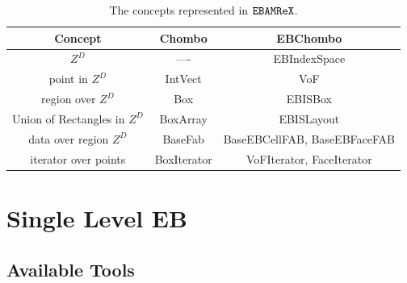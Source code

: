 \begin{table}
\begin{center}
\begin{tabular}{|c||c|c|} 
\hline
Concept & Chombo & EBChombo 
\\ \hline\hline
$Z^D$             &  ----   & EBIndexSpace
\\
point in $Z^D$    & IntVect & VoF 
\\
region over $Z^D$ & Box     & EBISBox
\\
Union of Rectangles in $Z^D$ & BoxArray     & EBISLayout
\\
data over region $Z^D$ & BaseFab & BaseEBCellFAB, BaseEBFaceFAB
\\ 
iterator over points & BoxIterator & VoFIterator, FaceIterator
\\ 
\hline                                                 
\end{tabular}
\end{center}
\caption{\label{fig::concepts} The concepts represented in $\tt{EBAMReX}$.}
\end{table}

\section{Single Level EB}
\label{sec:EB:EBTools}

\subsection{Available Tools}

